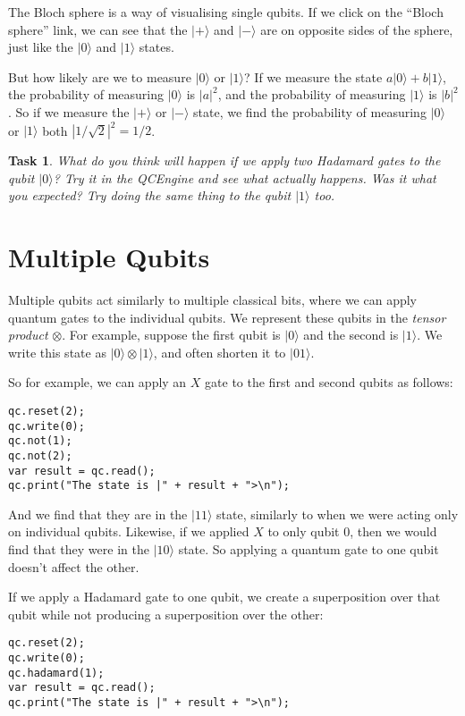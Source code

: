 \documentclass[twocolumn]{article}
\newtheorem{task}{Task}[section]
\begin{document}
The Bloch sphere is a way of visualising single qubits. If we click on the ``Bloch sphere'' link, we can see that the $|+\rangle$ and $|-\rangle$ are on opposite sides of the sphere, just like the $|0\rangle$ and $|1\rangle$ states.

But how likely are we to measure $|0\rangle$ or $|1\rangle$? If we measure the state $a|0\rangle + b|1\rangle$, the probability of measuring $|0\rangle$ is $|a|^2$, and the probability of measuring $|1\rangle$ is $|b|^2$. So if we measure the $|+\rangle$ or $|-\rangle$ state, we find the probability of measuring $|0\rangle$ or $|1\rangle$ both $|1/\sqrt{2}|^2 = 1/2$.

\begin{task}
What do you think will happen if we apply two Hadamard gates to the qubit $|0\rangle$? Try it in the QCEngine and see what actually happens. Was it what you expected? Try doing the same thing to the qubit $|1\rangle$ too.
\end{task}

\section{Multiple Qubits}

Multiple qubits act similarly to multiple classical bits, where we can apply quantum gates to the individual qubits. We represent these qubits in the {\em tensor product} $\otimes$. For example, suppose the first qubit is $|0\rangle$ and the second is $|1\rangle$. We write this state as $|0\rangle \otimes |1\rangle$, and often shorten it to $|01\rangle$.

So for example, we can apply an $X$ gate to the first and second qubits as follows:

\begin{lstlisting}
qc.reset(2);
qc.write(0);
qc.not(1);
qc.not(2);
var result = qc.read();
qc.print("The state is |" + result + ">\n");
\end{lstlisting}

And we find that they are in the $|11\rangle$ state, similarly to when we were acting only on individual qubits. Likewise, if we applied $X$ to only qubit $0$, then we would find that they were in the $|10\rangle$ state. So applying a quantum gate to one qubit doesn't affect the other.

If we apply a Hadamard gate to one qubit, we create a superposition over that qubit while not producing a superposition over the other:

\begin{lstlisting}
qc.reset(2);
qc.write(0);
qc.hadamard(1);
var result = qc.read();
qc.print("The state is |" + result + ">\n");
\end{lstlisting}
\end{document}
